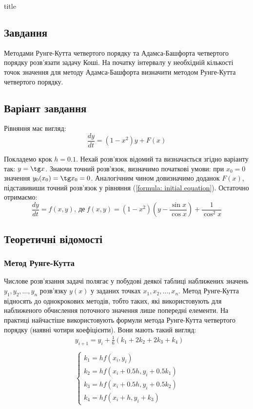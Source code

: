 \documentclass[a4paper,14pt]{extarticle} %
\begin{document}
{title}

\newpage
\subsection*{Завдання}

Методами Рунге-Кутта четвертого порядку та Адамса-Башфорта четвертого порядку розв'язати задачу Коші. На
початку інтервалу у необхідній кількості точок значення для методу  Адамса-Башфорта визначити методом
Рунге-Кутта четвертого порядку.

\subsection*{Варіант завдання}

Рівняння має вигляд: 
\begin{equation}
    \frac{dy}{dt}=(1-x^2)y + F(x) \label{formula: initial equation}
\end{equation}

Покладемо крок $h=0.1$. Нехай розв'язок відомий та визначається згідно варіанту так: $y=\tg x$. 
Знаючи точний розв'язок, визначимо початкові умови: при $x_0=0$ значення $y_0(x_0)=\tg x_0=0$. 
Аналогічним чином довизначимо доданок $F(x)$, підставивиши точний розв'язок у рівняння 
(\ref{formula: initial equation}). Остаточно отримаємо: 
\begin{equation}
    \frac{dy}{dt}=f(x,y),\ \text{де}\ f(x,y)=(1-x^2)(y-\frac{\sin x}{\cos x}) + \frac{1}{\cos^2 x} \label{formula: first equation}
\end{equation}

\subsection*{Теоретичні відомості}

\subsubsection*{Метод Рунге-Кутта}

Числове розв'язання задачі полягає у побудові деякої таблиці наближених значень $y_1, y_2, \ldots, y_n$
розв'язку $y(x)$ у заданих точках $x_1, x_2, \ldots, x_n$. Метод Рунге-Кутта відносять до однокрокових методів, 
тобто таких, які використовують для наближеного обчислення поточного значення лише попередні елементи. 
На практиці найчастіше використовують формули метода Рунге-Кутта четвертого порядку (наявні чотири коефіцієнти). 
Вони мають такий вигляд:
\begin{align*}
    &y_{i+1}=y_i + \tfrac{1}{6}(k_1 + 2k_2 + 2k_3 + k_4) \\ \\
    &\begin{cases}
        k_1=hf(x_i,y_i) \\
        k_2=hf(x_i+0.5h,y_i+0.5k_1) \\
        k_3=hf(x_i+0.5h,y_i+0.5k_2) \\
        k_4=hf(x_i+h,y_i+k_3)
    \end{cases}
\end{align*} 
\end{document}
